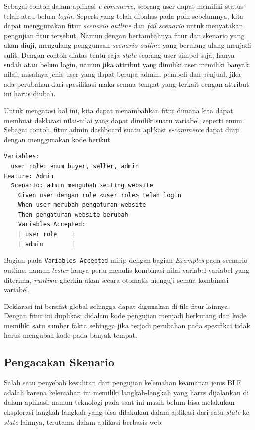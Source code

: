 Sebagai contoh dalam aplikasi \emph{e-commerce}, seorang user dapat memiliki status
telah atau belum \emph{login}. Seperti yang telah dibahas pada poin sebelumnya, kita dapat
menggunakan fitur \emph{scenario outline} dan \emph{fail scenario} untuk menyatakan
pengujian fitur tersebut. Namun dengan bertambahnya fitur dan skenario yang akan diuji,
mengulang penggunaan \emph{scenario outline} yang berulang-ulang menjadi sulit. Dengan contoh
diatas tentu saja \emph{state} seorang user simpel saja, hanya sudah atau belum login, namun
jika attribut yang dimiliki user memiliki banyak nilai, misalnya jenis user yang dapat
berupa admin, pembeli dan penjual, jika ada perubahan dari spesifikasi maka semua tempat
yang terkait dengan attribut ini harus diubah.

Untuk mengatasi hal ini, kita dapat menambahkan fitur dimana kita dapat membuat deklarasi
nilai-nilai yang dapat dimiliki suatu variabel, seperti enum. Sebagai contoh, fitur admin
dashboard suatu aplikasi \emph{e-commerce} dapat diuji dengan menggunakan kode berikut

\begin{lstlisting}[language=gherkin]
Variables:
  user role: enum buyer, seller, admin
Feature: Admin
  Scenario: admin mengubah setting website
    Given user dengan role <user role> telah login
    When user merubah pengaturan website
    Then pengaturan website berubah
    Variables Accepted:
    | user role    |
    | admin        |
\end{lstlisting}

Bagian pada \texttt{Variables Accepted} mirip dengan bagian \emph{Examples} pada
scenario outline, namun \emph{tester} hanya perlu menulis kombinasi nilai variabel-variabel
yang diterima, \emph{runtime} gherkin akan secara otomatis menguji semua kombinasi variabel.

Deklarasi ini bersifat global sehingga dapat digunakan di file fitur lainnya.
Dengan fitur ini duplikasi didalam kode pengujian menjadi berkurang dan
kode memiliki satu sumber fakta sehingga jika terjadi perubahan pada spesifikai tidak
harus mengubah kode pada banyak tempat.

\subsection{Pengacakan Skenario}

Salah satu penyebab kesulitan dari pengujian kelemahan keamanan jenis BLE adalah karena kelemahan
ini memiliki langkah-langkah yang harus dijalankan di dalam aplikasi, namun teknologi pada saat
ini masih belum bisa melakukan eksplorasi langkah-langkah yang bisa dilakukan dalam aplikasi
dari satu \emph{state} ke \emph{state} lainnya, terutama dalam aplikasi berbasis web.

